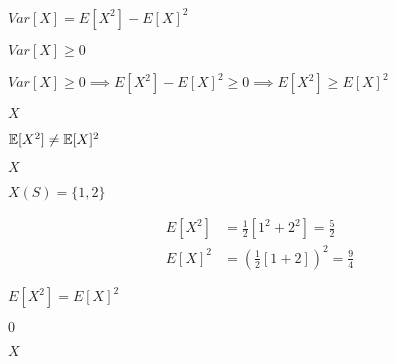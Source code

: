 \documentclass[10pt]{book}
\begin{document}
\begin{mdSnippets}
\begin{mdInlineSnippet}[367ca0f98f804962d7f9f3f5bb451ce6]%
$Var[X] = E[X^2] - E[X]^2$\end{mdInlineSnippet}%
\begin{mdInlineSnippet}%
$Var[X] \geq 0$\end{mdInlineSnippet}%
\begin{mdInlineSnippet}[c4feb9cf8f31580c42b05d59fb28b234]%
$Var[X] \geq 0 \implies E[X^2] - E[X]^2 \geq 0 \implies E[X^2] \geq E[X]^2$\end{mdInlineSnippet}%
\begin{mdInlineSnippet}[02129bb861061d1a052c592e2dc6b383]%
$X$\end{mdInlineSnippet}%
\begin{mdInlineSnippet}[837583c789cc041cb6fee2675de4550a]%
$\mathbb{E}[X^2] \neq \mathbb{E}[X]^2$\end{mdInlineSnippet}%
\begin{mdInlineSnippet}[02129bb861061d1a052c592e2dc6b383]%
$X$\end{mdInlineSnippet}%
\begin{mdInlineSnippet}[010ac4b713debffe565e65b74a086839]%
$X(S) = \{1,2\}$\end{mdInlineSnippet}%
\begin{mdDisplaySnippet}[6ad4906d78a34e5b8e6c2bc8553c22fb]%
\[%
\begin{aligned}
E[X^2] &= \frac{1}{2}[1^2 + 2^2] = \frac{5}{2}\\
E[X]^2 &= (\frac{1}{2}[1 + 2])^2 = \frac{9}{4}
\end{aligned}
\]%
\end{mdDisplaySnippet}%
\begin{mdInlineSnippet}[55a6a7ea52d0d448488a75e670428e1e]%
$E[X^2] = E[X]^2$\end{mdInlineSnippet}%
\begin{mdInlineSnippet}%
$0$\end{mdInlineSnippet}%
\begin{mdInlineSnippet}[02129bb861061d1a052c592e2dc6b383]%
$X$\end{mdInlineSnippet}%
\begin{mdInlineSnippet}[b62b9c1a6d38dcb32555f53fa998d7f3]%

\end{mdInlineSnippet}
\end{mdSnippets}
\end{document}
